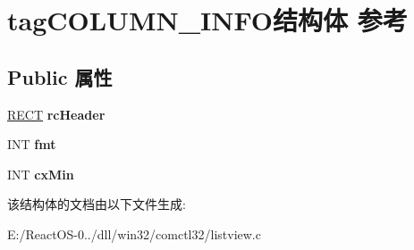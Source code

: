\hypertarget{structtag_c_o_l_u_m_n___i_n_f_o}{}\section{tag\+C\+O\+L\+U\+M\+N\+\_\+\+I\+N\+F\+O结构体 参考}
\label{structtag_c_o_l_u_m_n___i_n_f_o}
\subsection*{Public 属性}
\begin{DoxyCompactItemize}
\item 
\mbox{\label{structtag_c_o_l_u_m_n___i_n_f_o_a236b9dc6390b6eae4234e6abe0726c25}} 
\hyperlink{structtag_r_e_c_t}{R\+E\+CT} {\bfseries rc\+Header}
\item 
\mbox{\label{structtag_c_o_l_u_m_n___i_n_f_o_a257256edfb7dec7907934223e4907fea}} 
I\+NT {\bfseries fmt}
\item 
\mbox{\label{structtag_c_o_l_u_m_n___i_n_f_o_a74bb4de32b03fd251758b1512c10386e}} 
I\+NT {\bfseries cx\+Min}
\end{DoxyCompactItemize}


该结构体的文档由以下文件生成\+:\begin{DoxyCompactItemize}
\item 
E\+:/\+React\+O\+S-\/0../dll/win32/comctl32/listview.\+c\end{DoxyCompactItemize}
